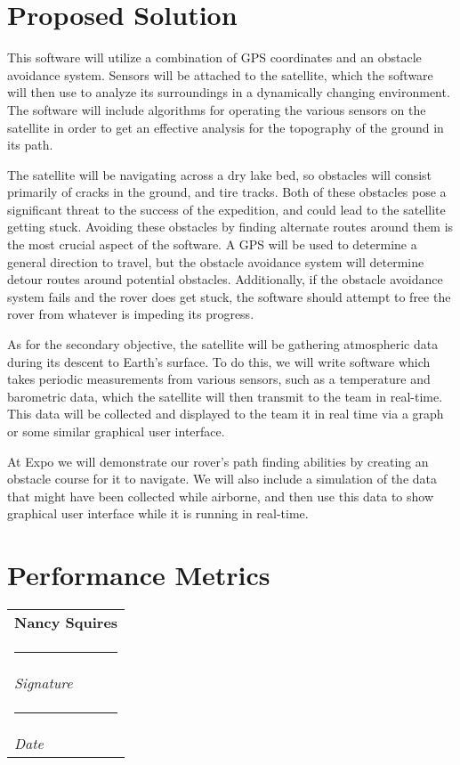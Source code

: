 \documentclass[10pt,onecolumn,draftclsnofoot,journal]{IEEEtran}
\makeatletter
\newcommand{\namesigdate}[2][8cm]{%
  	\begin{tabular}{@{}p{#1}@{}}
    		#2 \\[3\normalbaselineskip] \hrule \\[0pt]
    		{\small \textit{Signature}} 
		\\[2\normalbaselineskip] \hrule \\[0pt]
    		{\small \textit{Date}}
  	\end{tabular}
}
\makeatother
\begin{document}
\section*{\textbf{Proposed Solution}}
\noindent This software will utilize a combination of GPS coordinates and an obstacle avoidance system. Sensors will be attached to the satellite, which the software will then use to analyze its surroundings in a dynamically changing environment. The software will include algorithms for operating the various sensors on the satellite in order to get an effective analysis for the topography of the ground in its path.
\par\vspace{3mm} 
\noindent The satellite will be navigating across a dry lake bed, so obstacles will consist primarily of cracks in the ground, and tire tracks. Both of these obstacles pose a significant threat to the success of the expedition, and could lead to the satellite getting stuck. Avoiding these obstacles by finding alternate routes around them is the most crucial aspect of the software. A GPS will be used to determine a general direction to travel, but the obstacle avoidance system will determine detour routes around potential obstacles. Additionally, if the obstacle avoidance system fails and the rover does get stuck, the software should attempt to free the rover from whatever is impeding its progress. 
\par\vspace{3mm}
\noindent As for the secondary objective, the satellite will be gathering atmospheric data during its descent to Earth’s surface. To do this, we will write software which takes periodic measurements from various sensors, such as a temperature and barometric data, which the satellite will then transmit to the team in real-time. This data will be collected and displayed to the team it in real time via a graph or some similar graphical user interface. 
\par\vspace{3mm}
\noindent At Expo we will demonstrate our rover's path finding abilities by creating an obstacle course for it to navigate. We will also include a simulation of the data that might have been collected while airborne, and then use this data to show graphical user interface while it is running in real-time.

\section*{\textbf{Performance Metrics}}
\noindent

\vspace{1in}
\noindent \namesigdate{\textbf{Nancy Squires}}
\end{document}

